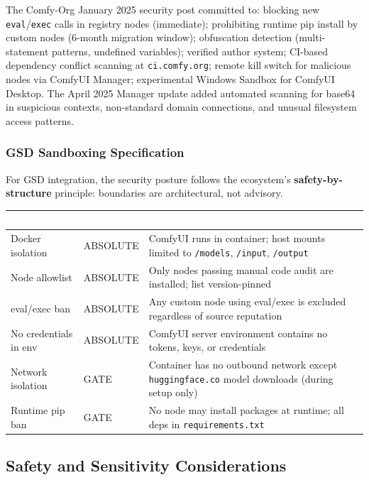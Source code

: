\documentclass[11pt,letterpaper]{article}
\newcommand{\tableheader}[1]{\textbf{\sffamily\textcolor{white}{#1}}}
\begin{document}
The Comfy-Org January 2025 security post committed to: blocking new \texttt{eval}/\texttt{exec}
calls in registry nodes (immediate); prohibiting runtime pip install by custom nodes
(6-month migration window); obfuscation detection (multi-statement patterns, undefined
variables); verified author system; CI-based dependency conflict scanning at
\texttt{ci.comfy.org}; remote kill switch for malicious nodes via ComfyUI Manager;
experimental Windows Sandbox for ComfyUI Desktop. The April 2025 Manager update added
automated scanning for base64 in suspicious contexts, non-standard domain connections,
and unusual filesystem access patterns.

\subsubsection{GSD Sandboxing Specification}

For GSD integration, the security posture follows the ecosystem's
\textbf{safety-by-structure} principle: boundaries are architectural, not advisory.

\begin{center}
\begin{tabularx}{\textwidth}{L{3.5cm}L{2cm}X}
\toprule
{}
\tableheader{Control} & \tableheader{Type} & \tableheader{Implementation} \\
\midrule
Docker isolation & ABSOLUTE & ComfyUI runs in container; host mounts limited to \texttt{/models}, \texttt{/input}, \texttt{/output} \\
Node allowlist & ABSOLUTE & Only nodes passing manual code audit are installed; list version-pinned \\
eval/exec ban & ABSOLUTE & Any custom node using eval/exec is excluded regardless of source reputation \\
No credentials in env & ABSOLUTE & ComfyUI server environment contains no tokens, keys, or credentials \\
Network isolation & GATE & Container has no outbound network except \texttt{huggingface.co} model downloads (during setup only) \\
Runtime pip ban & GATE & No node may install packages at runtime; all deps in \texttt{requirements.txt} \\
\bottomrule
\end{tabularx}
\end{center}

\subsection{Safety and Sensitivity Considerations}
\end{document}
